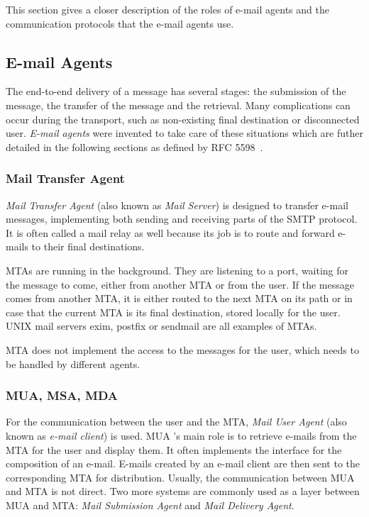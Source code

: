This section gives a closer description of the roles of e-mail agents and the communication protocols that the e-mail agents use.

\subsection{E-mail Agents}
The end-to-end delivery of a message has several stages: the submission of the message, the transfer of the message and the retrieval. Many complications can occur during the transport, such as non-existing final destination or disconnected user. \emph{E-mail agents} were invented to take care of these situations which are futher detailed in the following sections as defined by RFC 5598~\cite{rfc5598}.

\subsubsection{Mail Transfer Agent}
\emph{Mail Transfer Agent} (also known as \emph{Mail Server}) is designed to transfer e-mail messages, implementing both sending and receiving parts of the SMTP protocol.
It is often called a mail relay as well because its job is to route and forward e-mails to their final destinations.

MTAs are running in the background. They are listening to a port, waiting for the message to come, either from another MTA or from the user. If the message comes from another MTA, it is either routed to the next MTA on its path or in case that the current MTA is its final destination, stored locally for the user. 
UNIX mail servers exim, postfix or sendmail are all examples of MTAs.

MTA does not implement the access to the messages for the user, which needs to be handled by different agents.

\subsubsection{MUA, MSA, MDA}
For the communication between the user and the MTA, \emph{Mail User Agent} (also known as \emph{e-mail client}) is used. MUA 's main role is to retrieve e-mails from the MTA for the user and display them. It often implements the interface for the composition of an e-mail. E-mails created by an e-mail client are then sent to the corresponding MTA for distribution.
Usually, the communication between MUA and MTA is not direct. Two more systems are commonly used as a layer between MUA and MTA: \emph{Mail Submission Agent} and \emph{Mail Delivery Agent}.

